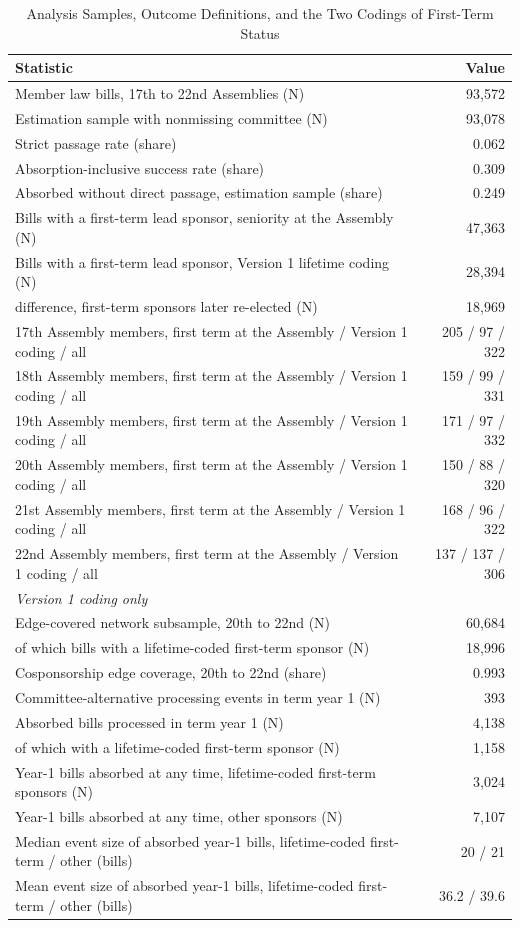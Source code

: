 \documentclass[11pt]{article}
\begin{document}
\begin{table}[H]
\centering
\singlespacing
\caption{Analysis Samples, Outcome Definitions, and the Two Codings of First-Term Status}
\label{tab:desc}
\small
\begin{tabular}{p{}r}
\toprule
Statistic & Value \\
\midrule
Member law bills, 17th to 22nd Assemblies (N) & 93,572 \\
Estimation sample with nonmissing committee (N) & 93,078 \\
Strict passage rate (share) & 0.062 \\
Absorption-inclusive success rate (share) & 0.309 \\
Absorbed without direct passage, estimation sample (share) & 0.249 \\
\midrule
Bills with a first-term lead sponsor, seniority at the Assembly (N) & 47,363 \\
Bills with a first-term lead sponsor, Version 1 lifetime coding (N) & 28,394 \\
\quad difference, first-term sponsors later re-elected (N) & 18,969 \\
\midrule
17th Assembly members, first term at the Assembly / Version 1 coding / all & 205 / 97 / 322 \\
18th Assembly members, first term at the Assembly / Version 1 coding / all & 159 / 99 / 331 \\
19th Assembly members, first term at the Assembly / Version 1 coding / all & 171 / 97 / 332 \\
20th Assembly members, first term at the Assembly / Version 1 coding / all & 150 / 88 / 320 \\
21st Assembly members, first term at the Assembly / Version 1 coding / all & 168 / 96 / 322 \\
22nd Assembly members, first term at the Assembly / Version 1 coding / all & 137 / 137 / 306 \\
\midrule
\multicolumn{2}{l}{\textit{Version 1 coding only}} \\
Edge-covered network subsample, 20th to 22nd (N) & 60,684 \\
\quad of which bills with a lifetime-coded first-term sponsor (N) & 18,996 \\
Cosponsorship edge coverage, 20th to 22nd (share) & 0.993 \\
Committee-alternative processing events in term year 1 (N) & 393 \\
Absorbed bills processed in term year 1 (N) & 4,138 \\
\quad of which with a lifetime-coded first-term sponsor (N) & 1,158 \\
Year-1 bills absorbed at any time, lifetime-coded first-term sponsors (N) & 3,024 \\
Year-1 bills absorbed at any time, other sponsors (N) & 7,107 \\
Median event size of absorbed year-1 bills, lifetime-coded first-term / other (bills) & 20 / 21 \\
Mean event size of absorbed year-1 bills, lifetime-coded first-term / other (bills) & 36.2 / 39.6 \\
\bottomrule
\end{tabular}


\end{table}
\end{document}
